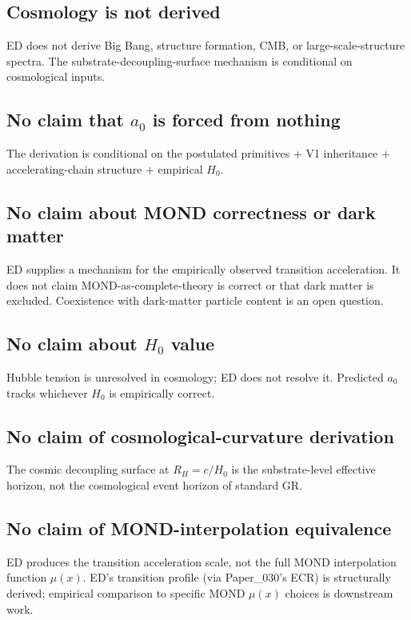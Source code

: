 \documentclass[11pt,a4paper]{article}
\begin{document}
\subsection{Cosmology is not derived}

ED does not derive Big Bang, structure formation, CMB, or large-scale-structure spectra. The substrate-decoupling-surface mechanism is conditional on cosmological inputs.

\subsection{No claim that $a_0$ is forced from nothing}

The derivation is conditional on the postulated primitives + V1 inheritance + accelerating-chain structure + empirical $H_0$.

\subsection{No claim about MOND correctness or dark matter}

ED supplies a mechanism for the empirically observed transition acceleration. It does not claim MOND-as-complete-theory is correct or that dark matter is excluded. Coexistence with dark-matter particle content is an open question.

\subsection{No claim about $H_0$ value}

Hubble tension is unresolved in cosmology; ED does not resolve it. Predicted $a_0$ tracks whichever $H_0$ is empirically correct.

\subsection{No claim of cosmological-curvature derivation}

The cosmic decoupling surface at $R_H = c/H_0$ is the substrate-level effective horizon, not the cosmological event horizon of standard GR.

\subsection{No claim of MOND-interpolation equivalence}

ED produces the transition acceleration scale, not the full MOND interpolation function $\mu(x)$. ED's transition profile (via Paper\_030's ECR) is structurally derived; empirical comparison to specific MOND $\mu(x)$ choices is downstream work.
\end{document}
